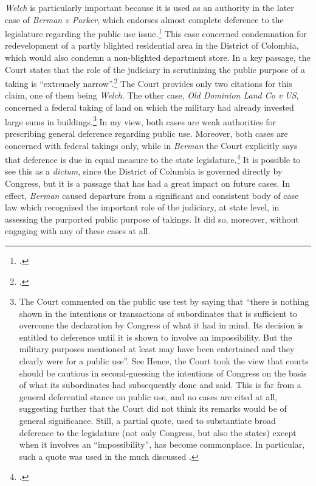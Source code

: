 \documentclass[12pt,a4paper]{book} %
\begin{document}
{\it Welch} is particularly important because it is used as an authority in the later case of {\it Berman v Parker}, which endorses almost complete deference to the legislature regarding the public use issue.\footcite[32]{berman54} This case concerned condemnation for redevelopment of a partly blighted residential area in the District of Colombia, which would also condemn a non-blighted department store. In a key passage, the Court states that the role of the judiciary in scrutinizing the public purpose of a taking is ``extremely narrow''.\footcite[32]{berman54} The Court provides only two citations for this claim, one of them being {\it Welch}. The other case, {\it Old Dominion Land Co v US}, concerned a federal taking of land on which the military had already invested large sums in buildings.\footnote{The Court commented on the public use test by saying that ``there is nothing shown in the intentions or transactions of subordinates that is sufficient to overcome the declaration by Congress of what it had in mind. Its decision is entitled to deference until it is shown to involve an impossibility. But the military purposes mentioned at least may have been entertained and they clearly were for a public use''. See \cite[66]{dominion25} Hence, the Court took the view that courts should be cautious in second-guessing the intentions of Congress on the basis of what its subordinates had subsequently done and said. This is far from a general deferential stance on public use, and no cases are cited at all, suggesting further that the Court did not think its remarks would be of general significance. Still, a partial quote, used to substantiate  broad deference to the legislature (not only Congress, but also the states) except when it involves an ``impossibility'', has become commonplace. In particular, such a quote was used in the much discussed \cite[240]{midkiff84}.}
In my view, both cases are weak authorities for prescribing general deference regarding public use. Moreover, both cases are concerned with federal takings only, while in {\it Berman} the Court explicitly says that deference is due in equal measure to the state legislature.\footcite[32]{berman54} It is possible to see this as a {\it dictum}, since the District of Columbia is governed directly by Congress, but it is a passage that has had a great impact on future cases. In effect, {\it Berman} caused departure from a significant and consistent body of case law which recognized the important role of the judiciary, at state level, in assessing the purported public purpose of takings. It did so, moreover, without engaging with any of these cases at all.
\end{document}
